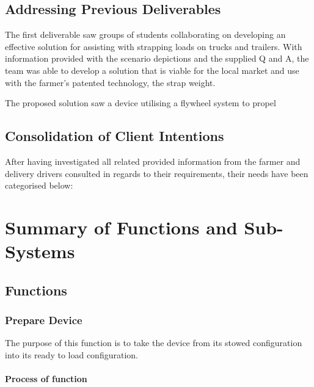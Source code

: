\documentclass[a4paper,10pt]{article} %
\begin{document}
\subsection{Addressing Previous Deliverables}

The first deliverable saw groups of students collaborating on developing an effective solution for assisting with strapping loads on trucks and trailers. With information provided with the scenario depictions and the supplied Q and A, the team was able to develop a solution that is viable for the local market and use with the farmer's patented technology, the strap weight. \\ \bigskip

The proposed solution saw a device utilising a flywheel system to propel 

\subsection{Consolidation of Client Intentions}

After having investigated all related provided information from the farmer and delivery drivers consulted in regards to their requirements, their needs have been categorised below:


\newpage

\section{Summary of Functions and Sub-Systems}

\subsection{Functions}

\subsubsection{Prepare Device}

The purpose of this function is to take the device from its stowed configuration into its ready to load configuration.

\paragraph{Process of function}
\end{document}
